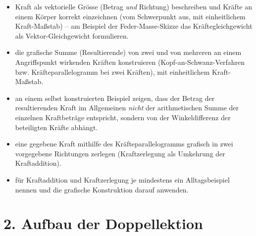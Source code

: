 \documentclass[11pt,a4paper]{article}
\begin{document}
\begin{itemize}[leftmargin=1.3cm,itemsep=0.3em]
  \item[LZ1] Kraft als vektorielle Grösse (Betrag \emph{und} Richtung)
  beschreiben und Kräfte an einem Körper korrekt einzeichnen (vom
  Schwerpunkt aus, mit einheitlichem Kraft-Maßstab) -- am Beispiel der
  Feder-Masse-Skizze das Kräftegleichgewicht als Vektor-Gleichgewicht
  formulieren.
  \item[LZ2] die grafische Summe (Resultierende) von zwei und von
  mehreren an einem Angriffspunkt wirkenden Kräften konstruieren
  (Kopf-an-Schwanz-Verfahren bzw. Kräfteparallelogramm bei zwei Kräften),
  mit einheitlichem Kraft-Maßstab.
  \item[LZ3] an einem selbst konstruierten Beispiel zeigen, dass der
  Betrag der resultierenden Kraft im Allgemeinen \emph{nicht} der
  arithmetischen Summe der einzelnen Kraftbeträge entspricht, sondern von
  der Winkeldifferenz der beteiligten Kräfte abhängt.
  \item[LZ4] eine gegebene Kraft mithilfe des Kräfteparallelogramms
  grafisch in zwei vorgegebene Richtungen zerlegen (Kraftzerlegung als
  Umkehrung der Kraftaddition).
  \item[LZ5] für Kraftaddition und Kraftzerlegung je mindestens ein
  Alltagsbeispiel nennen und die grafische Konstruktion darauf anwenden.
\end{itemize}

\section*{2. Aufbau der Doppellektion}
\end{document}

